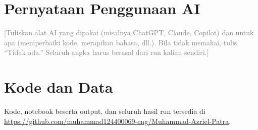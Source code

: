 \documentclass[conference,a4paper]{IEEEtran}
\newcommand{\petunjuk}[1]{\textcolor{gray}{[#1]}}
\begin{document}
\section*{Pernyataan Penggunaan AI}
\petunjuk{Tuliskan alat AI yang dipakai (misalnya ChatGPT, Claude, Copilot) dan untuk apa (memperbaiki kode, merapikan bahasa, dll.). Bila tidak memakai, tulis ``Tidak ada.'' Seluruh angka harus berasal dari run kalian sendiri.}

\section*{Kode dan Data}
Kode, notebook beserta output, dan seluruh hasil run tersedia di \url{https://github.com/muhammad124400069-eng/Muhammad-Azriel-Patra}.



\end{document}
